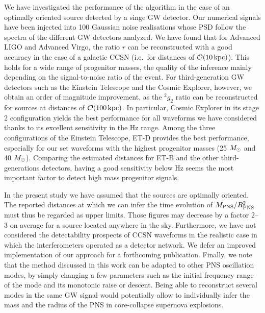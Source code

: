We have investigated the performance of the algorithm in the case of an optimally oriented source detected by a singe GW detector. Our numerical signals have been injected into 100 Gaussian noise realisations whose PSD follow the spectra of the different GW detectors analyzed. We have found that for Advanced LIGO and Advanced Virgo, the ratio $r$ can be reconstructed with a good accuracy in the case of a galactic CCSN (i.e.~for distances of ${\cal O}(10\, {\rm kpc})$). This holds for a wide range of progenitor masses, the quality of the inference mainly depending on the signal-to-noise ratio of the event. For third-generation GW detectors such as the Einstein Telescope and the Cosmic Explorer, however, we obtain an order of magnitude improvement, as the $\mbox{}^2g_2$ ratio can be reconstructed for sources at distances of ${\cal O}(100\, {\rm kpc})$. In particular, Cosmic Explorer in its stage 2 configuration yields the best performance for all waveforms we have considered thanks to its excellent sensitivity in the \unit[100-1000]{Hz} range. Among the three configurations of the Einstein Telescope, ET-D provides the best performance, especially for our set waveforms with the highest progenitor masses (25 $M_{\odot}$ and 40 $M_{\odot}$). Comparing the estimated distances for ET-B and the other third-generations detectors, having a good sensitivity below \unit[200]{Hz} seems the most important factor to detect high mass progenitor signals.

In the present study we have assumed that the sources are optimally oriented. The reported distances at which
we can infer the time evolution of $M_{\rm PNS}/R_{\rm PNS}^2$ must thus be regarded as upper limits. Those figures may decrease by a factor 2--3 on average for a source located anywhere in the sky. Furthermore, we have not considered the detectability prospects of  CCSN waveforms in the realistic case in which the  interferometers operated as a detector network. 
We defer an improved implementation of our approach for a forthcoming publication. Finally, we note that the method discussed in this work can be adapted to other PNS oscillation modes, by simply changing a few parameters such as the initial frequency range of the mode and its monotonic raise or descent. Being able to reconstruct several modes in the same GW signal would potentially allow to individually infer the mass and the radius of the PNS in core-collapse supernova explosions.




